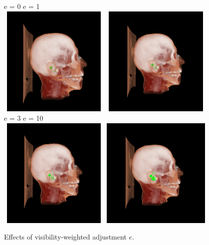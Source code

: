 \begin{figure}[ht]
\centering
e = 0    \hspace{140pt}      e = 1 \\
\vspace{3pt}
\includegraphics[width=150pt,height=150pt]{Images/i=0.png}
\includegraphics[width=150pt,height=150pt]{Images/i=1.png}\\
e = 3    \hspace{140pt}      e = 10 \\
\vspace{3pt}
\includegraphics[width=150pt,height=150pt]{Images/i=3.png}
\includegraphics[width=150pt,height=150pt]{Images/i=10.png}
\caption{Effects of visibility-weighted adjustment $e$. }
\end{figure}



